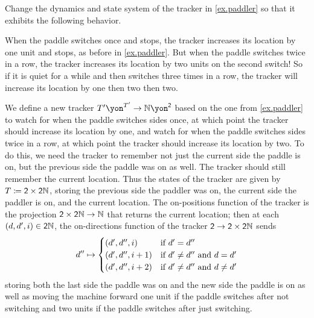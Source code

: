 \documentclass[Book-Poly]{subfiles}
\begin{document}
\begin{exercise}
Change the dynamics and state system of the tracker in \cref{ex.paddler} so that it exhibits the following behavior.

When the paddle switches once and stops, the tracker increases its location by one unit and stops, as before in \cref{ex.paddler}. But when the paddle switches twice in a row, the tracker increases its location by two units on the second switch! So if it is quiet for a while and then switches three times in a row, the tracker will increase its location by one then two then two.
\begin{solution}
We define a new tracker $T'\yon^{T'}\to\nn\yon^\2$ based on the one from \cref{ex.paddler} to watch for when the paddle switches sides once, at which point the tracker should increase its location by one, and watch for when the paddle switches sides twice in a row, at which point the tracker should increase its location by two.
To do this, we need the tracker to remember not just the current side the paddle is on, but the previous side the paddle was on as well.
The tracker should still remember the current location.
Thus the states of the tracker are given by $T\coloneqq\textsf{2}\times\textsf{2}\mathbb{N}$, storing the previous side the paddler was on, the current side the paddler is on, and the current location.
The on-positions function of the tracker is the projection $\textsf{2}\times\textsf{2}\mathbb{N}\to\mathbb{N}$ that returns the current location; then at each $(d,d',i)\in\textsf{2}\mathbb{N}$, the on-directions function of the tracker $\textsf{2}\to\textsf{2}\times\textsf{2}\mathbb{N}$ sends
\[
  d''\mapsto
	\begin{cases}
		(d',d'',i)&\textnormal{if }d'=d''\\
		(d',d'',i+1)&\textnormal{if }d'\neq d''\textnormal{ and }d=d'\\
		(d',d'',i+2)&\textnormal{if }d'\neq d''\textnormal{ and }d\neq d'
	\end{cases}
\]
storing both the last side the paddle was on and the new side the paddle is on as well as moving the machine forward one unit if the paddle switches after not switching and two units if the paddle switches after just switching.
\end{solution}
\end{exercise}
\end{document}
